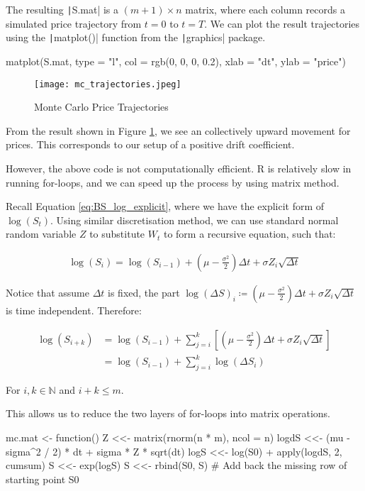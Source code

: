 The resulting \texttt|S.mat| is a $(m + 1) \times n$ matrix, where each column records a simulated price trajectory from $t=0$ to $t=T$. We can plot the result trajectories using the \texttt|matplot()| function from the \texttt|graphics| package.

\begin{Rminted}
matplot(S.mat, type = "l", col = rgb(0, 0, 0, 0.2),
        xlab = "dt", ylab = "price")
\end{Rminted}

\begin{figure}[H]
	\centering
	\texttt{[image: mc\_trajectories.jpeg]}
	\caption{Monte Carlo Price Trajectories} \label{img:mc_trajectories}
\end{figure}

From the result shown in Figure \ref{img:mc_trajectories}, we see an collectively upward movement for prices. This corresponds to our setup of a positive drift coefficient.

However, the above code is not computationally efficient. R is relatively slow in running for-loops, and we can speed up the process by using matrix method.

Recall Equation \ref{eq:BS_log_explicit}, where we have the explicit form of $\log(S_t)$. Using similar discretisation method, we can use standard normal random variable $Z$ to substitute $W_t$ to form a recursive equation, such that:

\begin{align*}
\log(S_i) = \log(S_{i-1}) + (\mu - \frac{\sigma^2}{2})\Delta t + \sigma Z_i \sqrt{\Delta t}
\end{align*}

Notice that assume $\Delta t$ is fixed, the part $\log(\Delta S)_i\coloneqq(\mu - \frac{\sigma^2}{2})\Delta t + \sigma Z_i \sqrt{\Delta t}$ is time independent. Therefore:

\begin{align} \label{eq:mc_matrix}
\log(S_{i+k}) &= \log(S_{i-1}) + \sum_{j=i}^{k}{\left[(\mu - \frac{\sigma^2}{2})\Delta t + \sigma Z_i \sqrt{\Delta t}\right]} \\
&= \log(S_{i-1}) + \sum_{j=i}^{k}{\log(\Delta S_i)}
\end{align}

For $i,k\in\mathbb{N}$ and $i+k\leq m$.

This allows us to reduce the two layers of for-loops into matrix operations.

\begin{Rminted}
mc.mat <- function() {
    Z <<- matrix(rnorm(n * m), ncol = n)
    logdS <<- (mu - sigma^2 / 2) * dt + sigma * Z * sqrt(dt)
    logS <<- log(S0) + apply(logdS, 2, cumsum)
    S <<- exp(logS)
    S <<- rbind(S0, S) # Add back the missing row of starting point S0
}
\end{Rminted}

